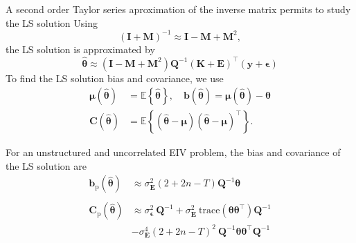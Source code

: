 \documentclass[presentation]{beamer}
\begin{document}
\begin{frame}[label={slide:statistical2}]{A second order Taylor series aproximation of the inverse matrix permits to study the LS solution}
Using
\begin{equation*} (\mathbf{I} + \mathbf{M})^{-1} \approx \mathbf{I} - \mathbf{M} + \mathbf{M}^2, \end{equation*} 
the LS solution is approximated by
\begin{equation*} \widehat{\bm{\theta}} \approx \left( \mathbf{I} - \mathbf{M} + \mathbf{M}^2 \right) \mathbf{Q}^{-1} (\mathbf{K}+\mathbf{E})^\top (\mathbf{y}+\bm{\epsilon}) \end{equation*} 
\linebreak
To find the LS solution bias and covariance, we use
\begin{equation*} \begin{aligned} \bm{\mu} \left(\widehat{\bm{\theta}} \right) &= \mathbb{E} \left\{ \widehat{\bm{\theta}} \right\}, \quad \mathbf{b} \left(\widehat{\bm{\theta}} \right) = \bm{\mu}\left(\widehat{\bm{\theta}} \right) - \bm{\theta} \\
\mathbf{C} \left( \widehat{\bm{\theta}} \right) &= \mathbb{E} \left\{ \left( \widehat{\bm{\theta}} - \bm{\mu} \right) \left( \widehat{\bm{\theta}} - \bm{\mu} \right)^\top \right\} . \end{aligned} \end{equation*} 
\end{frame}

\begin{frame}[label={slide:statistical3}]{For an unstructured and uncorrelated EIV problem, the bias and covariance of the LS solution are}
\begin{equation*} \begin{aligned} \mathbf{b}_{\mathrm{p}} \left( \widehat{\bm{\theta}} \right) & \approx \sigma_{\mathbf{E}}^2 \left( 2 + 2n - T \right) \mathbf{Q}^{-1} \bm{\theta} \\
\\
\mathbf{C}_{\mathrm{p}} \left( \widehat{\bm{\theta}} \right) & \approx \sigma_{\bm{\epsilon}}^2 \ \mathbf{Q}^{-1} + \sigma_{\mathbf{E}}^2 \ \mathrm{trace} \left( \bm{\theta} \bm{\theta}^\top \right) \mathbf{Q}^{-1} \\
\quad & - \sigma_{\mathbf{E}}^4 \left( 2 + 2n - T \right)^2 \ \mathbf{Q}^{-1} \bm{\theta} \bm{\theta}^\top \mathbf{Q}^{-1}  \end{aligned} \end{equation*}
\end{frame}
\end{document}
